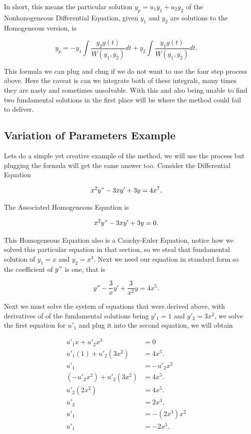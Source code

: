 \documentclass[12pt]{article}
\begin{document}
In short, this means the particular solution $y_p=u_1y_1+u_2y_2$ of the Nonhonogeneous Differential Equation, given $y_1$ and $y_2$ are solutions to the Homogeneous version, is

\begin{equation*}
    y_p = -y_1\int \frac{y_2g(t)}{W(y_1,y_2)} dt + y_2 \int \frac{y_1g(t)}{W(y_1,y_2)} dt.
\end{equation*}

This formula we can plug and chug if we do not want to use the four step process above. Here the caveat is can we integrate both of these integrals, many times they are nasty and sometimes unsolvable. With this and also being unable to find two fundamental solutions in the first place will be where the method could fail to deliver.

\subsection{Variation of Parameters Example}

Lets do a simple yet creative example of the method, we will use the process but plugging the formula will get the same answer too. Consider the Differential Equation

\begin{equation*}
    x^2y"-3xy'+3y=4x^7.
\end{equation*}

The Associated Homogeneous Equation is

\begin{equation*}
    x^2y"-3xy'+3y=0.
\end{equation*}

This Homogeneous Equation also is a Cauchy-Euler Equation, notice how we solved this particular equation in that section, so we steal that fundamental solution of $y_1=x$ and $y_2=x^3$. Next we need our equation in standard form so the coefficient of $y"$ is one, that is

\begin{equation*}
    y''-\frac{3}{x}y'+\frac{3}{x^2}y=4x^5.
\end{equation*}

Next we must solve the system of equations that were derived above, with derivatives of of the fundamental solutions being $y'_1=1$ and $y'_2=3x^2$, we solve the first equation for $u'_1$ and plug it into the second equation, we will obtain

\begin{align*}
    u'_1x+u'_2x^3 &= 0 \\
    u'_1(1)+u'_2(3x^2) &= 4x^5. \\
    u'_1&=-u'_2x^2 \\
    (-u'_2x^2)+u'_2(3x^2) &= 4x^5. \\
    u'_2(2x^2)&=4x^5. \\
    u'_2&= 2x^3. \\
    u'_1 &= -(2x^3)x^2 \\
    u'_1 &= -2x^5.
\end{align*}
\end{document}
